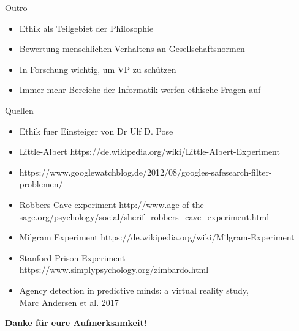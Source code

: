 \documentclass[10pt]{beamer}
\begin{document}
\begin{frame}{Outro}
	\begin{itemize}
		\item Ethik als Teilgebiet der Philosophie
		\item Bewertung menschlichen Verhaltens an Gesellschaftsnormen
		\item In Forschung wichtig, um VP zu schützen
		\item Immer mehr Bereiche der Informatik werfen ethische Fragen auf
	\end{itemize}
\end{frame}


\begin{frame}{Quellen}
	\begin{itemize}
		\item Ethik fuer Einsteiger von Dr Ulf D. Pose
		\item Little-Albert https://de.wikipedia.org/wiki/Little-Albert-Experiment
		\item https://www.googlewatchblog.de/2012/08/googles-safesearch-filter-problemen/
		\item Robbers Cave experiment http://www.age-of-the-sage.org/psychology/social/sherif\_robbers\_cave\_experiment.html
		\item Milgram Experiment https://de.wikipedia.org/wiki/Milgram-Experiment
		\item Stanford Prison Experiment https://www.simplypsychology.org/zimbardo.html
		\item Agency detection in predictive minds: a virtual reality study, \\ Marc Andersen et al. 2017
	\end{itemize}
	
\end{frame}


\begin{frame}{}
	\textbf{Danke für eure Aufmerksamkeit!}
\end{frame}
\end{document}
